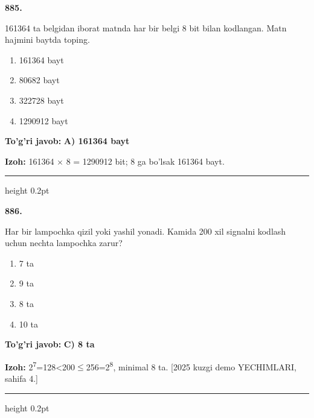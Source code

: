 \documentclass[10pt,a4paper,oneside]{article}
\begin{document}
\noindent\textbf{\color{ink}885.}
\par
161364 ta belgidan iborat matnda har bir belgi 8 bit bilan kodlangan. Matn hajmini baytda toping.
\begin{enumerate}[label=\Alph*),leftmargin=9mm]
\item 161364 bayt
\item 80682 bayt
\item 322728 bayt
\item 1290912 bayt
\end{enumerate}
\begin{tcolorbox}[enhanced,breakable,colback=teal!4,colframe=teal!50!black,boxrule=0.5pt,arc=1.1mm,left=3mm,right=3mm,top=1.7mm,bottom=1.7mm,before skip=2mm,after skip=2mm]
\textbf{\color{teal}To'g'ri javob:} \textbf{A) 161364 bayt}
\par\smallskip
\textbf{Izoh:} 161364 \ensuremath{\times} 8 = 1290912 bit; 8 ga bo'lsak 161364 bayt.
\end{tcolorbox}
\vspace{2mm}\hrule height 0.2pt \vspace{3mm}

\noindent\textbf{\color{ink}886.}
\par
Har bir lampochka qizil yoki yashil yonadi. Kamida 200 xil signalni kodlash uchun nechta lampochka zarur?
\begin{enumerate}[label=\Alph*),leftmargin=9mm]
\item 7 ta
\item 9 ta
\item 8 ta
\item 10 ta
\end{enumerate}
\begin{tcolorbox}[enhanced,breakable,colback=teal!4,colframe=teal!50!black,boxrule=0.5pt,arc=1.1mm,left=3mm,right=3mm,top=1.7mm,bottom=1.7mm,before skip=2mm,after skip=2mm]
\textbf{\color{teal}To'g'ri javob:} \textbf{C) 8 ta}
\par\smallskip
\textbf{Izoh:} 2\textsuperscript{7}=128\textless{}200\ensuremath{\leq}256=2\textsuperscript{8}, minimal 8 ta. [2025 kuzgi demo YECHIMLARI, sahifa 4.]
\end{tcolorbox}
\vspace{2mm}\hrule height 0.2pt \vspace{3mm}
\end{document}

